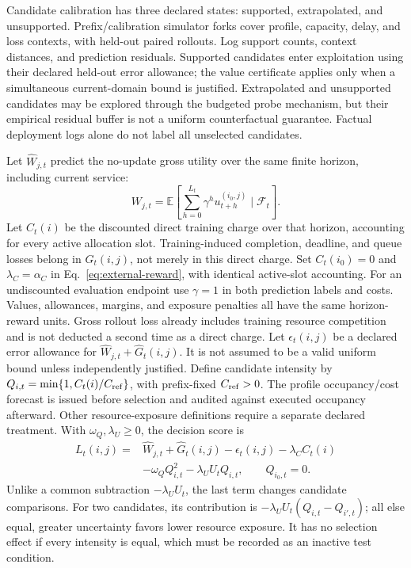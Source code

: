 \documentclass[10pt]{article}
\newcommand{\E}{\mathbb{E}}
\begin{document}
Candidate calibration has three declared states: supported, extrapolated,
and unsupported. Prefix/calibration simulator forks cover profile, capacity,
delay, and loss contexts, with held-out paired rollouts. Log support counts,
context distances, and prediction residuals. Supported candidates enter
exploitation using their declared held-out error allowance; the value certificate
applies only when a simultaneous current-domain bound is justified. Extrapolated and
unsupported candidates may be explored through the budgeted probe mechanism,
but their empirical residual buffer is not a uniform counterfactual guarantee.
Factual deployment logs alone do not label all unselected candidates.

Let $\widehat W_{j,t}$ predict the no-update gross utility over the same
finite horizon, including current service:
\begin{equation}
 W_{j,t}=\E\!\left[\sum_{h=0}^{L_t}\gamma^h
 u_{t+h}^{(i_0,j)}\mid\mathcal F_t\right].
\end{equation}
Let $C_t(i)$ be the discounted direct training charge over that horizon,
accounting for every active allocation slot. Training-induced completion,
deadline, and queue losses belong in $G_t(i,j)$, not merely in this direct
charge. Set $C_t(i_0)=0$ and $\lambda_C=\alpha_C$ in
Eq.~\eqref{eq:external-reward}, with identical active-slot accounting.
For an undiscounted evaluation endpoint use $\gamma=1$ in both prediction
labels and costs. Values, allowances, margins, and exposure penalties all have
the same horizon-reward units. Gross rollout loss already includes training
resource competition and is not deducted a second time as a direct charge.
Let
$\epsilon_t(i,j)$ be a declared error allowance for
$\widehat W_{j,t}+\widehat G_t(i,j)$. It is not assumed to be a valid uniform
bound unless independently justified. Define candidate intensity by
$Q_{i,t}=\min\{1,C_t(i)/C_{\rm ref}\}$, with prefix-fixed $C_{\rm ref}>0$.
The profile occupancy/cost forecast is issued before selection and audited
against executed occupancy afterward. Other resource-exposure definitions
require a separate declared treatment. With $\omega_Q,\lambda_U\ge0$,
the decision score is
\begin{align}
 L_t(i,j)={}&\widehat W_{j,t}+\widehat G_t(i,j)-\epsilon_t(i,j)
             -\lambda_C C_t(i)\nonumber\\
            &-\omega_Q Q_{i,t}^2-\lambda_U U_t Q_{i,t},
 \qquad Q_{i_0,t}=0.
 \label{eq:candidate-score}
\end{align}
Unlike a common subtraction $-\lambda_U U_t$, the last term changes candidate
comparisons. For two candidates, its contribution is
$-\lambda_U U_t(Q_{i,t}-Q_{i',t})$; all else equal, greater uncertainty favors
lower resource exposure. It has no selection effect if every intensity is equal,
which must be recorded as an inactive test condition.
\end{document}
